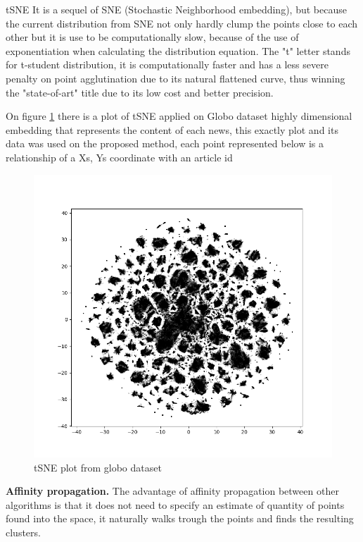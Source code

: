 \documentclass[ecp,tc,english]{iiufrgs}
\begin{document}
    tSNE It is a sequel of SNE (Stochastic Neighborhood embedding), but because the current distribution from SNE not only hardly clump the points close to each other but it is use to be computationally slow, because of the use of exponentiation when calculating the distribution equation.
    The "t" letter stands for t-student distribution, it is computationally faster and has a less severe penalty on point agglutination due to its natural flattened curve, thus winning the "state-of-art" title due to its low cost and better precision.

    On figure \ref{fig:tsne_plot} there is a plot of tSNE applied on Globo dataset highly dimensional embedding that represents the content of each news, this exactly plot and its data was used on the proposed method, each point represented below is a relationship of a Xs, Ys coordinate with an article id 

    \begin{figure}[H]
        \centering
        \includegraphics[width=1\textwidth]{images/tsne_clusters.png}
        \caption{tSNE plot from globo dataset}
        \label{fig:tsne_plot}
    \end{figure}

    \textbf{Affinity propagation.} The advantage of affinity propagation between other algorithms is that it does not need to specify an estimate of quantity of points found into the space, it naturally walks trough the points and finds the resulting clusters.
\end{document}
